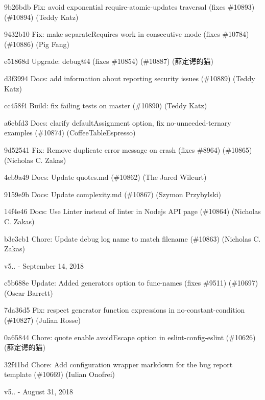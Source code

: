 \begin{DoxyItemize}
\item 9b26bdb Fix\+: avoid exponential require-\/atomic-\/updates traversal (fixes \#10893) (\#10894) (Teddy Katz)
\item 9432b10 Fix\+: make separate\+Requires work in consecutive mode (fixes \#10784) (\#10886) (Pig Fang)
\item e51868d Upgrade\+: debug@4 (fixes \#10854) (\#10887) (薛定谔的猫)
\item d3f3994 Docs\+: add information about reporting security issues (\#10889) (Teddy Katz)
\item cc458f4 Build\+: fix failing tests on master (\#10890) (Teddy Katz)
\item a6ebfd3 Docs\+: clarify default\+Assignment option, fix no-\/unneeded-\/ternary examples (\#10874) (Coffee\+Table\+Espresso)
\item 9d52541 Fix\+: Remove duplicate error message on crash (fixes \#8964) (\#10865) (Nicholas C. Zakas)
\item 4eb9a49 Docs\+: Update quotes.\+md (\#10862) (The Jared Wilcurt)
\item 9159e9b Docs\+: Update complexity.\+md (\#10867) (Szymon Przybylski)
\item 14f4e46 Docs\+: Use Linter instead of linter in Nodejs API page (\#10864) (Nicholas C. Zakas)
\item b3e3cb1 Chore\+: Update debug log name to match filename (\#10863) (Nicholas C. Zakas)
\end{DoxyItemize}

v5.. -\/ September 14, 2018


\begin{DoxyItemize}
\item c5b688e Update\+: Added generators option to func-\/names (fixes \#9511) (\#10697) (Oscar Barrett)
\item 7da36d5 Fix\+: respect generator function expressions in no-\/constant-\/condition (\#10827) (Julian Rosse)
\item 0a65844 Chore\+: quote enable avoid\+Escape option in eslint-\/config-\/eslint (\#10626) (薛定谔的猫)
\item 32f41bd Chore\+: Add configuration wrapper markdown for the bug report template (\#10669) (Iulian Onofrei)
\end{DoxyItemize}

v5.. -\/ August 31, 2018


